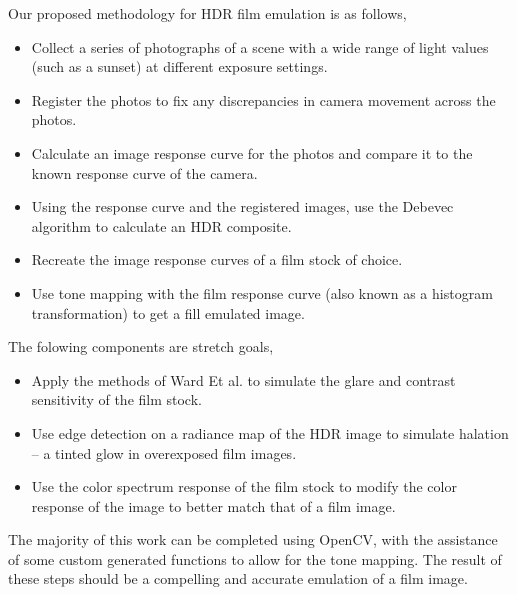 \documentclass[
	a4paper, %
	10pt, %
	unnumberedsections, %
	twoside, %
]{LTJournalArticle}
\begin{document}
Our proposed methodology for HDR film emulation is as follows,
\begin{itemize}
	\item Collect a series of photographs of a scene with a wide range of light values (such as a sunset) at different exposure settings.
	\item Register the photos to fix any discrepancies in camera movement across the photos.
	\item Calculate an image response curve for the photos and compare it to the known response curve of the camera.
	\item Using the response curve and the registered images, use the Debevec algorithm to calculate an HDR composite.
	\item Recreate the image response curves of a film stock of choice.
	\item Use tone mapping with the film response curve (also known as a histogram transformation) to get a fill emulated image.
\end{itemize}
The folowing components are stretch goals,
\begin{itemize}
	\item Apply the methods of Ward Et al. to simulate the glare and contrast sensitivity of the film stock.
	\item Use edge detection on a radiance map of the HDR image to simulate halation – a tinted glow in overexposed film images.
	\item Use the color spectrum response of the film stock to modify the color response of the image to better match that of a film image. 
\end{itemize}
The majority of this work can be completed using OpenCV, with the assistance of some custom generated functions to allow for the tone mapping. The result of these steps should be a compelling and accurate emulation of a film image.



\end{document}
